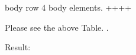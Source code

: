 \documentclass[letterpaper,11pt,english]{sphinxmanual}
\begin{document}
\begin{sphinxVerbatim}[commandchars=\\\{\}]
         body row 4             \textbar{}            \textbar{} \PYGZhy{} body elements.    \textbar{}
        +\PYGZhy{}\PYGZhy{}\PYGZhy{}\PYGZhy{}\PYGZhy{}\PYGZhy{}\PYGZhy{}\PYGZhy{}\PYGZhy{}\PYGZhy{}\PYGZhy{}\PYGZhy{}\PYGZhy{}\PYGZhy{}\PYGZhy{}\PYGZhy{}\PYGZhy{}\PYGZhy{}\PYGZhy{}\PYGZhy{}\PYGZhy{}\PYGZhy{}\PYGZhy{}\PYGZhy{}+\PYGZhy{}\PYGZhy{}\PYGZhy{}\PYGZhy{}\PYGZhy{}\PYGZhy{}\PYGZhy{}\PYGZhy{}\PYGZhy{}\PYGZhy{}\PYGZhy{}\PYGZhy{}+\PYGZhy{}\PYGZhy{}\PYGZhy{}\PYGZhy{}\PYGZhy{}\PYGZhy{}\PYGZhy{}\PYGZhy{}\PYGZhy{}\PYGZhy{}\PYGZhy{}\PYGZhy{}\PYGZhy{}\PYGZhy{}\PYGZhy{}\PYGZhy{}\PYGZhy{}\PYGZhy{}\PYGZhy{}\PYGZhy{}\PYGZhy{}+

Please see the above Table. .
\end{sphinxVerbatim}

Result:
\end{document}
